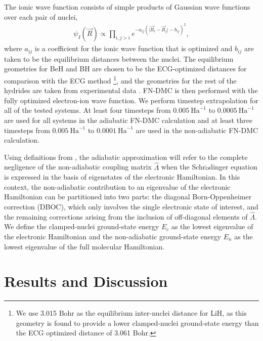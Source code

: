 \documentclass[pra,superscriptaddress,groupedaddress,twocolumn]{revtex4}
\begin{document}
The ionic wave function consists of simple products of Gaussian wave functions over each pair of nuclei,
\begin{align}
\psi_I(\vec{R})\propto \prod\limits_{i,j>i}e^{-a_{ij}(\vert \vec{R}_i-\vec{R}_j\vert-b_{ij})^2},
\label{wfs_ions}
\end{align}
where $a_{ij}$ is a coefficient for the ionic wave function that is optimized and $b_{ij}$ are taken to be the equilibrium distances between the nuclei.  The equilibrium geometries for BeH and BH are chosen to be the ECG-optimized distances for comparison with the ECG method \footnote{We use 3.015 Bohr as the equilibrium inter-nuclei distance for LiH, as this geometry is found to provide a lower clamped-nuclei ground-state energy than the ECG optimized distance of 3.061 Bohr.}, and the geometries for the rest of the hydrides are taken from experimental data \cite{CCCBDB}. FN-DMC is then performed with the fully optimized electron-ion wave function. We perform timestep extrapolation for all of the tested systems. At least four timesteps from $0.005~\text{Ha}^{-1}$ to $0.0005~\text{Ha}^{-1}$ are used for all systems in the adiabatic FN-DMC calculation and at least three timesteps from $0.005~\text{Ha}^{-1}$ to $0.0001~\text{Ha}^{-1}$ are used in the non-adiabatic FN-DMC calculation.

Using definitions from \cite{Cederbaum_Review}, the adiabatic approximation will refer to the complete negligence of the non-adiabatic coupling matrix $\hat{\Lambda}$ when the Schr$\ddot{\text{o}}$dinger equation is expressed in the basis of eigenstates of the electronic Hamiltonian. In this context, the non-adiabatic contribution to an eigenvalue of the electronic Hamiltonian can be partitioned into two parts: the diagonal Born-Oppenheimer correction (DBOC), which only involves the single electronic state of interest, and the remaining corrections arising from the inclusion of off-diagonal elements of $\hat{\Lambda}$. We define the clamped-nuclei ground-state energy $E_c$ as the lowest eigenvalue of the electronic Hamiltonian and the non-adiabatic ground-state energy $E_n$ as the lowest eigenvalue of the full molecular Hamiltonian.

\section{Results and Discussion}


\end{document}
